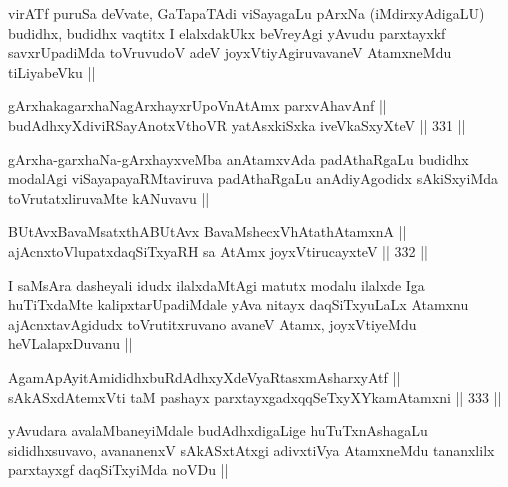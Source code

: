 \begin{artha}
virATf puruSa deVvate, GaTapaTAdi viSayagaLu pArxNa (iMdirxyAdigaLU) budidhx, budidhx vaqtitx I elalxdakUkx beVreyAgi yAvudu parxtayxkf savxrUpadiMda toVruvudoV adeV joyxVtiyAgiruvavaneV AtamxneMdu tiLiyabeVku ||
\end{artha}


\begin{shl}
gArxhakagarxhaNagArxhayxrUpoV\s nAtAmx parxvAhavAnf || \\
budAdhxyXdiviRSayAnotxV\s thoVR yatAsxkiSxka iveVkaSxyXteV ||  331 ||  
\end{shl}

\begin{artha}
gArxha-garxhaNa-gArxhayxveMba anAtamxvAda padAthaRgaLu budidhx modalAgi viSayapayaRMtaviruva padAthaRgaLu anAdiyAgodidx sAkiSxyiMda toVrutatxliruvaMte kANuvavu ||
\end{artha}


\begin{shl}
BUtAvx\s BavaMsatxthA\s BUtAvx BavaMshecxVhAtathAtamxnA || \\
ajAcnxtoV\s lupatxdaqSiTxyaRH sa AtAmx joyxVtirucayxteV ||  332 ||  
\end{shl}

\begin{artha}
I saMsAra dasheyali idudx ilalxdaMtAgi matutx modalu ilalxde Iga huTiTxdaMte kalipxtarUpadiMdale yAva nitayx daqSiTxyuLaLx Atamxnu ajAcnxtavAgidudx toVrutitxruvano avaneV Atamx, joyxVtiyeMdu heVLalapxDuvanu ||
\end{artha}


\begin{shl}
AgamApAyitAmididhxbuRdAdhxyXdeVyaRtasxmAsharxyAtf ||  \\
sAkASxdAtemxVti taM pashayx parxtayxgadxqqSeTxyXYkamAtamxni ||  333 ||  
\end{shl}

\begin{artha}
yAvudara avalaMbaneyiMdale budAdhxdigaLige huTuTxnAshagaLu sididhxsuvavo, avananenxV sAkASxtAtxgi adivxtiVya AtamxneMdu tananxlilx parxtayxgf daqSiTxyiMda noVDu ||
\end{artha}

